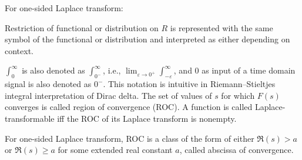 \documentclass[a4paper,12pt]{article}
\begin{document}
For one-sided Laplace transform:
\bit
\item Restriction of functional or distribution on $R$ is represented with the same symbol of the functional or distribution and interpreted as either depending on context.
\item $\int_0^{\infty}$ is also denoted as $\int_{0^-}^{\infty}$, i.e., $\lim_{\varepsilon\to 0^+}\int_{-\varepsilon}^{\infty}$, and $0$ as input of a time domain signal is also denoted as $0^-$. This notation is intuitive in Riemann–Stieltjes integral interpretation of Dirac delta.
\eit
{}
The set of values of $s$ for which $F(s)$ converges is called region of convergence (ROC). A function is called Laplace-transformable iff the ROC of its Laplace transform is nonempty.

For one-sided Laplace transform, ROC is a class of the form of either $\Re(s) > a$ or $\Re(s) \geq a$ for some extended real constant $a$, called abscissa of convergence.
\end{document}
